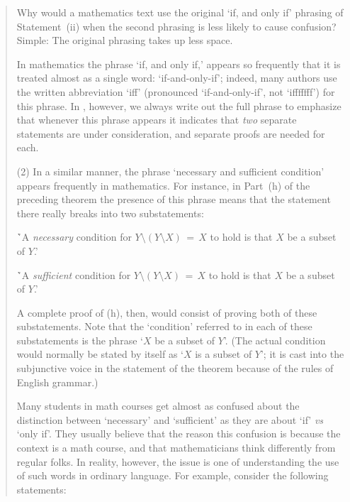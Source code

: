 \begin{quotation}
{\VA

        Why would a mathematics text use the original `if, and only if' phrasing  of Statement~(ii) when the second phrasing is less likely to cause confusion?
    Simple: The original phrasing takes up less space.

        In mathematics the phrase `if, and only if,' appears so frequently that it is treated almost as a single word: `if-and-only-if';
    indeed, many authors use the written abbreviation `iff' (pronounced `if-and-only-if', not `ifffffff') for this phrase.
    In {\TheseNotes}, however, we always write out the full phrase
    to emphasize that whenever this phrase appears
    it indicates that {\em two} separate statements are under consideration, and separate proofs are needed for each.

\V

        (2)  In a similar manner, the phrase `necessary and sufficient condition'  appears frequently in mathematics.
    For instance, in Part~(h) of the preceding theorem the presence of this phrase means that the statement there really breaks into two substatements:

\VA

        \h `A {\em necessary} condition for $Y{\setminus}(Y{\setminus}X) \,=\, X$ to hold is that $X$ be a subset of $Y$.'

        \h `A {\em sufficient} condition for $Y{\setminus}(Y{\setminus}X) \,=\, X$ to hold is that $X$ be a subset of $Y$.'

\VA

\noindent A complete proof of (h), then, would consist of proving both of these substatements.
    Note that the `condition' referred to in each of these substatements is the phrase `$X$ be a subset of $Y$'.
    (The actual condition would normally be stated by itself as `$X$ is a subset of $Y$'; it is cast into the subjunctive voice in the statement of the theorem because of the rules of English grammar.)

        Many students in math courses get almost as confused about the distinction between `necessary' and `sufficient' as they are about `if' {\em vs} `only if'.
    They usually believe that the reason this confusion is because the context is a math course, and that mathematicians think differently from regular folks.
    In reality, however, the issue is one of understanding the use of such words in ordinary language.
    For example, consider the following statements:

}
\end{quotation}
